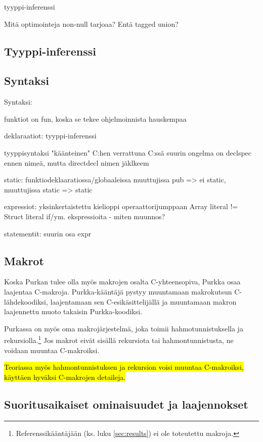 tyyppi-inferenssi

Mitä optimointeja non-null tarjoaa? Entä tagged union?

\subsection{Tyyppi-inferenssi}



\subsection{Syntaksi}

Syntaksi:

funktiot on fun, koska se tekee ohjelmoinnista hauskempaa

deklaraatiot: tyyppi-inferenssi

tyyppisyntaksi "käänteinen" C:hen verrattuna
C:ssä suurin ongelma on declspec ennen nimeä, mutta directdecl nimen jäklkeem

static:
    funktiodeklaaratiossa/globaaleissa muuttujissa pub => ei static,
    muuttujissa static => static

expressiot:
    yksinkertaistettu kielioppi operaattorijumppaan
    Array literal != Struct literal
    if/ym. ekspressioita
        - miten muunnos?

statementit:
    suurin osa expr

\subsection{Makrot}

Koska Purkan tulee olla myös makrojen osalta C-yhteensopiva, Purkka osaa
laajentaa C-makroja. Purkka-kääntäjä pystyy muuntamaan makrokutsun
C-lähdekoodiksi, laajentamaan sen C-esikäsittelijällä ja muuntamaan makron
laajennettu muoto takaisin Purkka-koodiksi.

Purkassa on myös oma makrojärjestelmä, joka toimii hahmotunnistuksella ja
rekursiolla.\footnote{Referenssikääntäjään (ks. luku \ref{sec:results}) ei ole
toteutettu makroja.} Jos makrot eivät sisällä rekursiota tai hahmontunnistusta,
ne voidaan muuntaa C-makroiksi.

\hl{Teoriassa myös hahmontunnistuksen ja rekursion voisi muuntaa C-makroiksi,
käyttäen hyväksi C-makrojen detaileja.}

\subsection{Suoritusaikaiset ominaisuudet ja laajennokset}

